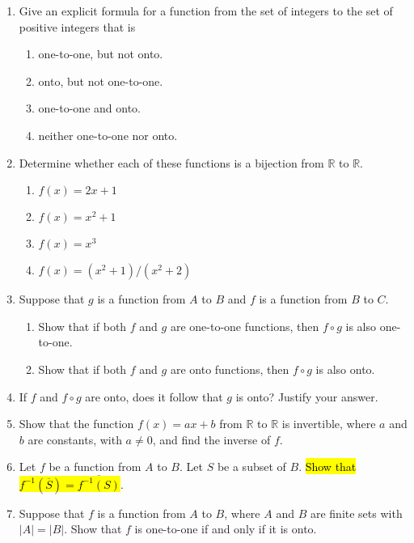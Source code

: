 \documentclass{../../cls/sig-alternate-05-2015}
\begin{document}
\begin{enumerate}
\item Give an explicit formula for a function from the set of
integers to the set of positive integers that is
	\begin{enumerate}
	\item one-to-one, but not onto.
	\item onto, but not one-to-one.
	\item one-to-one and onto.
	\item neither one-to-one nor onto.
	\end{enumerate}

\item Determine whether each of these functions is a bijection
from $\mathbb{R}$ to $\mathbb{R}$.
	\begin{enumerate}
		\item $f(x)=2x+1$
		\item $f(x)=x^2+1$
		\item $f(x)=x^3$
		\item $f(x)=(x^2+1)/(x^2+2)$
	\end{enumerate}

\item 
Suppose that $g$ is a function from $A$ to $B$ and $f$ is a
function from $B$ to $C$.
	\begin{enumerate}
		\item Show that if both $f$ and $g$ are one-to-one functions,
		then $f\circ g$ is also one-to-one.
		
		\item Show that if both $f$ and $g$ are onto functions, then
		$f \circ  g$ is also onto.
	\end{enumerate}
	
\item If $f$ and $f \circ g$ are onto, does it follow that $g$ is onto?
Justify your answer.

\item Show that the function $f (x) = ax + b$ from  $\mathbb{R}$ to  $\mathbb{R}$ is
invertible, where $a$ and $b$ are constants, with $a\neq 0$, and
find the inverse of $f$.

\item Let $f$ be a function from $A$ to $B$. Let $S$ be a subset of $B$.
\hl{Show that $f^{-1}(\overline{S})=\overline{f^{-1}(S)}$}.

\item Suppose that $f$ is a function from $A$ to $B$, where $A$ and $B$
are finite sets with $|A| = |B|$. Show that $f$ is one-to-one
if and only if it is onto.


\end{enumerate}
\end{document}
